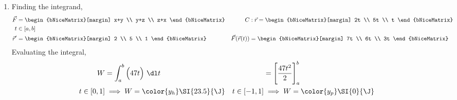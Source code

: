 \begin{enumerate}
    \item Finding the integrand,
          \begin{align}
              \vec{F}             & = \begin{bNiceMatrix}[margin]
                                          x+y \\ y+z \\ z+x
                                      \end{bNiceMatrix}           &
              C                   & : \vec{r} = \begin{bNiceMatrix}[margin]
                                                    2t \\ 5t \\ t
                                                \end{bNiceMatrix} \\
              t                   & \in [a, b]                             \\
              \vec{r}'            & = \begin{bNiceMatrix}[margin]
                                          2 \\ 5 \\ 1
                                      \end{bNiceMatrix}           &
              \vec{F}(\vec{r}(t)) & = \begin{bNiceMatrix}[margin]
                                          7t \\ 6t \\ 3t
                                      \end{bNiceMatrix}
          \end{align}
          Evaluating the integral,
          \begin{align}
              W             & = \int_{a}^{b} \Big( 47t \Big)\ \dl t  &
                            & = \Bigg[ \frac{47t^2}{2} \Bigg]_a^{b}    \\
              t \in [0, 1]  & \implies W = \color{y_h} \SI{23.5}{\J} &
              t \in [-1, 1] & \implies W = \color{y_p} \SI{0}{\J}
          \end{align}


\end{enumerate}
